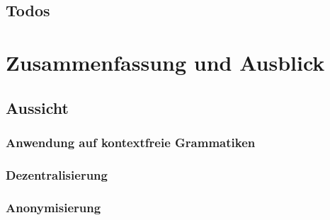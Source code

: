 \documentclass[]{article}
\begin{document}
\subsection*{Todos}

\listoftodos[Aufgaben]




\section{Zusammenfassung und Ausblick}

\subsection*{Aussicht}

\subsubsection*{Anwendung auf kontextfreie Grammatiken}



\subsubsection*{Dezentralisierung}

\subsubsection*{Anonymisierung}
\end{document}
